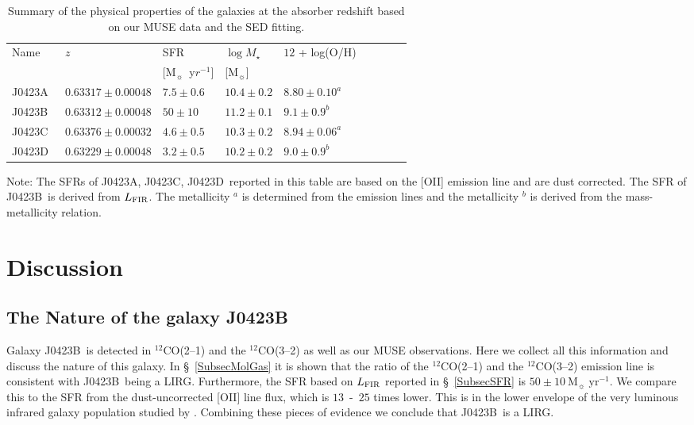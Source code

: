\documentclass[a4paper,fleqn,usenatbib]{mnras}
\newcommand{\GalA}{J0423A}
\newcommand{\GalB}{J0423B}
\newcommand{\GalC}{J0423C}
\newcommand{\GalD}{J0423D}
\begin{document}
\begin{table*}
\begin{minipage}{\linewidth}
\caption{Summary of the physical properties of the galaxies at the absorber redshift based on our MUSE data and the SED fitting.}
\label{TabPhysParam}
\centering
\begin{tabular}{lllllllll}
\hline
Name & $z$ & SFR  & $\log M_{\star}$ & $12$ + log(O/H)\\
& & [M$_{\sun}$~y$r^{-1}$] &  [M$_{\sun}$] & \\
\hline
\GalA\ 	& $0.63317 \pm 0.00048$ & $7.5 \pm 0.6$ & $10.4 \pm 0.2$ 	& $8.80 \pm 0.10^a$ \\%
\GalB\ 	& $0.63312 \pm  0.00048$ & $50 \pm 10$ &  $11.2 \pm 0.1$ &  $9.1 \pm 0.9^b$\\
\GalC\ 		& $0.63376 \pm 0.00032$ & $4.6 \pm 0.5$  & $10.3 \pm 0.2$ & $8.94 \pm 0.06^a$  \\%
\GalD\ 		&  $0.63229 \pm 0.00048$ & $3.2 \pm 0.5$  & $10.2 \pm 0.2$  & $9.0 \pm 0.9^b$\\
\hline
\end{tabular}
\end{minipage}
\begin{minipage}{\linewidth}
Note: The SFRs of \GalA, \GalC, \GalD\ reported in this table are based on the [OII] emission line and are dust corrected. The SFR of \GalB\ is derived from $L_{\rm FIR}$. The metallicity $^a$ is determined from the emission lines and the metallicity $^b$ is derived from the mass-metallicity relation.
\end{minipage}
\end{table*}



\section{Discussion}

\subsection{The Nature of the galaxy J0423B}
\label{SubsecJ0423B-LIRG}

Galaxy \GalB\ is detected in $^{12}$CO(2--1) and the $^{12}$CO(3--2) as well as our MUSE observations. Here we collect all this information and discuss the nature of this galaxy. In \S~\ref{SubsecMolGas} it is shown that the ratio of the $^{12}$CO(2--1) and the $^{12}$CO(3--2) emission line is consistent with \GalB\ being a LIRG. Furthermore, the SFR based on $L_{\rm FIR}$ reported in \S~\ref{SubsecSFR} is $50 \pm 10~\text{M} _{\sun}\; \text{yr}^{-1} $. We compare this to the SFR from the dust-uncorrected [OII] line flux, which is $13$~-~$25$ times lower. This is in the lower envelope of the very luminous infrared galaxy population studied by \citet{Poggianti2000optical}. Combining these pieces of evidence we conclude that \GalB\ is a LIRG.
\end{document}
